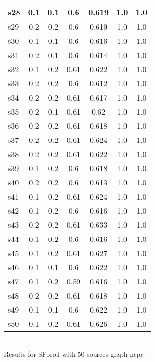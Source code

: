 \documentclass{article}
\begin{document}
\begin{tabular}{|l|c|c|c|c|c|c|}
\hline
s28 &0.1 & 0.1 & 0.6 & 0.619 & 1.0 & 1.0\\
\hline
s29 &0.2 & 0.2 & 0.6 & 0.619 & 1.0 & 1.0\\
\hline
s30 &0.1 & 0.1 & 0.6 & 0.616 & 1.0 & 1.0\\
\hline
s31 &0.2 & 0.1 & 0.6 & 0.614 & 1.0 & 1.0\\
\hline
s32 &0.1 & 0.2 & 0.61 & 0.622 & 1.0 & 1.0\\
\hline
s33 &0.2 & 0.2 & 0.6 & 0.612 & 1.0 & 1.0\\
\hline
s34 &0.2 & 0.2 & 0.61 & 0.617 & 1.0 & 1.0\\
\hline
s35 &0.2 & 0.1 & 0.61 & 0.62 & 1.0 & 1.0\\
\hline
s36 &0.2 & 0.2 & 0.61 & 0.618 & 1.0 & 1.0\\
\hline
s37 &0.2 & 0.2 & 0.61 & 0.624 & 1.0 & 1.0\\
\hline
s38 &0.2 & 0.2 & 0.61 & 0.622 & 1.0 & 1.0\\
\hline
s39 &0.1 & 0.2 & 0.6 & 0.618 & 1.0 & 1.0\\
\hline
s40 &0.2 & 0.2 & 0.6 & 0.613 & 1.0 & 1.0\\
\hline
s41 &0.1 & 0.2 & 0.61 & 0.624 & 1.0 & 1.0\\
\hline
s42 &0.1 & 0.2 & 0.6 & 0.616 & 1.0 & 1.0\\
\hline
s43 &0.2 & 0.2 & 0.61 & 0.633 & 1.0 & 1.0\\
\hline
s44 &0.1 & 0.2 & 0.6 & 0.616 & 1.0 & 1.0\\
\hline
s45 &0.1 & 0.2 & 0.61 & 0.627 & 1.0 & 1.0\\
\hline
s46 &0.1 & 0.1 & 0.6 & 0.622 & 1.0 & 1.0\\
\hline
s47 &0.1 & 0.2 & 0.59 & 0.616 & 1.0 & 1.0\\
\hline
s48 &0.2 & 0.2 & 0.61 & 0.618 & 1.0 & 1.0\\
\hline
s49 &0.1 & 0.1 & 0.6 & 0.622 & 1.0 & 1.0\\
\hline
s50 &0.1 & 0.2 & 0.61 & 0.626 & 1.0 & 1.0\\
\hline
\end{tabular}\\

\noindent Results for SFprod with 50 sources graph ncpr.
\end{document}
